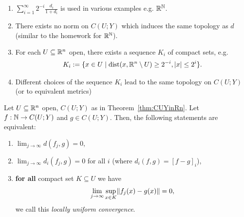 \documentclass[language=english]{../../Template/TemplateLecture}
\begin{document}
\begin{bemerkung}
    \begin{enumerate}[$(i)$]
        \item $\sum_{i = 1}^\infty 2^{-i} \frac{d_i}{1+d_i}$ is used in various examples e.g. $\mathbb{R}^{\mathbb{N}}$.
        \item There exists no norm on $C(U;Y)$ which induces the same topology as $d$ (similar to the homework for $\mathbb{R}^{\mathbb{N}}$).
        \item For each $U \subseteq \mathbb{R}^n$ open, there exists a sequence $K_i$ of compact sets, e.g.
        \begin{equation}
            K_i := \{x \in U \mid \operatorname{dist}(x, \mathbb{R}^n \setminus U) \geq 2^{-i}, \lvert x\rvert \leq 2^i\}.
        \end{equation}
        \item Different choices of the sequence $K_i$ lead to the same topology on $C(U;Y)$ (or to equivalent metrics)
    \end{enumerate}
\end{bemerkung}

\begin{prop}
    Let $U \subseteq \mathbb{R}^n$ open, $C(U;Y)$ as in Theorem~\ref{thm:CUYinRn}. Let $f: \mathbb{N} \to C(U;Y)$ and $g \in C(U;Y)$. Then, the following statements are equivalent:
    \begin{enumerate}[$(i)$]
        \item $\lim_{j \to \infty} d(f_j,g) = 0$,
        \item $\lim_{j \to \infty} d_i(f_j, g) = 0$ for all $i$ (where $d_i(f,g) = [f - g]_i$),
        \item \textbf{for all} compact set $K \subseteq U$ we have 
        \begin{equation}
            \lim_{j \to \infty} \sup_{x \in K} \lVert f_j(x) - g(x)\rVert = 0,
        \end{equation}
        we call this \emph{locally uniform convergence}.
    \end{enumerate}
\end{prop}
\end{document}

